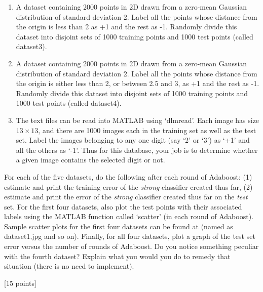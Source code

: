 \documentclass[11pt]{article}
\begin{document}
\begin{enumerate}
\begin{enumerate}
\item A dataset containing 2000 points in 2D drawn from a zero-mean Gaussian distribution of standard deviation 2. Label all the points whose distance from the origin is less than 2 as +1 and the rest as -1. Randomly divide this dataset into disjoint sets of 1000 training points and 1000 test points (called dataset3). 



\item A dataset containing 2000 points in 2D drawn from a zero-mean Gaussian distribution of standard deviation 2. Label all the points whose distance from the origin is either less than 2, or between 2.5 and 3, as +1 and the rest as -1. Randomly divide this dataset into disjoint sets of 1000 training points and 1000 test points (called dataset4). 


\item The text files can be read into MATLAB using `dlmread'. Each image has size $13 \times 13$, and there are 1000 images each in the training set as well as the test set. Label the images belonging to any one digit (say `2' or `3') as `+1' and all the others as `-1'. Thus for this database, your job is to determine whether a given image contains the selected digit or not.


\end{enumerate}
For each of the five datasets, do the following after each round of Adaboost: (1) estimate and print the training error of the \emph{strong} classifier created thus far, (2) estimate and print the error of the \emph{strong} classifier created thus far on the \emph{test} set. For the first four datasets, also plot the test points with their associated labels using the MATLAB function called `scatter' (in each round of Adaboost). Sample scatter plots for the first four datasets can be found at (named as dataset1.jpg and so on). Finally, for all four datasets, plot a graph of the test set error versus the number of rounds of Adaboost. Do you notice something peculiar with the fourth dataset? Explain what you would you do to remedy that situation (there is no need to implement). 
\end{enumerate}
\textsf{[15 points]}
\end{document}
